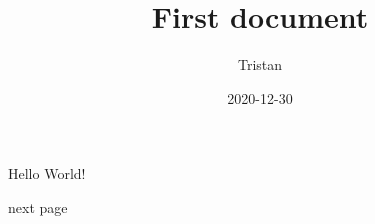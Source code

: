 \documentclass{article}
\title{First document}
\date{2020-12-30}
\author{Tristan}
\begin{document}
	\maketitle
	\newpage

	Hello World!

	\newpage
	next page
\end{document}
